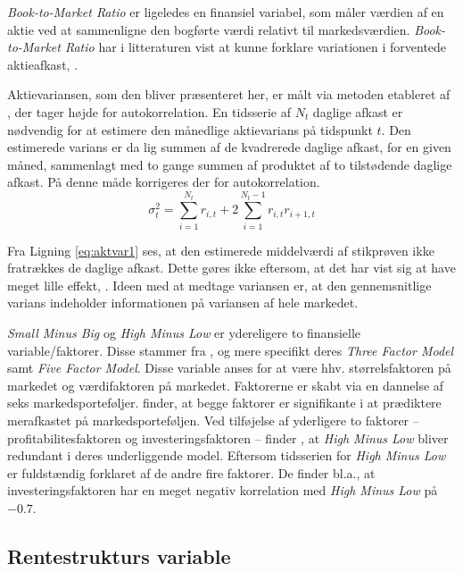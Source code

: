 \documentclass[
  a4paper,
  oneside]{memoir}
\begin{document}
\emph{Book-to-Market Ratio} er ligeledes en finansiel variabel, som måler værdien af en aktie ved at sammenligne den bogførte værdi relativt til markedsværdien. \emph{Book-to-Market Ratio} har i litteraturen vist at kunne forklare variationen i forventede aktieafkast, \citep{Kothari1997}.

Aktievariansen, som den bliver præsenteret her, er målt via metoden etableret af \citep{Schwert1987}, der tager højde for autokorrelation. En tidsserie af \(N_t\) daglige afkast er nødvendig for at estimere den månedlige aktievarians på tidspunkt \(t\). Den estimerede varians er da lig summen af de kvadrerede daglige afkast, for en given måned, sammenlagt med to gange summen af produktet af to tilstødende daglige afkast. På denne måde korrigeres der for autokorrelation.
\begin{equation}
\sigma^2_t = \sum_{i=1}^{N_t} r_{i,t} + 2 \sum_{i=1}^{N_t-1} r_{i,t}r_{i+1,t} \label{eq:aktvar1}
\end{equation}

Fra Ligning \eqref{eq:aktvar1} ses, at den estimerede middelværdi af stikprøven ikke fratrækkes de daglige afkast. Dette gøres ikke eftersom, at det har vist sig at have meget lille effekt, \citep{Schwert1987}. Ideen med at medtage variansen er, at den gennemsnitlige varians indeholder informationen på variansen af hele markedet.

\emph{Small Minus Big} og \emph{High Minus Low} er ydereligere to finansielle variable/faktorer. Disse stammer fra \citep{French1993, Fama2015}, og mere specifikt deres \emph{Three Factor Model} samt \emph{Five Factor Model}. Disse variable anses for at være hhv. størrelsfaktoren på markedet og værdifaktoren på markedet. Faktorerne er skabt via en dannelse af seks markedsporteføljer. \citep{French1993} finder, at begge faktorer er signifikante i at prædiktere merafkastet på markedsporteføljen. Ved tilføjelse af yderligere to faktorer -- profitabilitesfaktoren og investeringsfaktoren -- finder \citep{Fama2015}, at \emph{High Minus Low} bliver redundant i deres underliggende model. Eftersom tidsserien for \emph{High Minus Low} er fuldstændig forklaret af de andre fire faktorer. De finder bl.a., at investeringsfaktoren har en meget negativ korrelation med \emph{High Minus Low} på \(-0.7\).

\hypertarget{rentestrukturs-variable}{%
\subsection{Rentestrukturs variable}\label{rentestrukturs-variable}}
\end{document}
